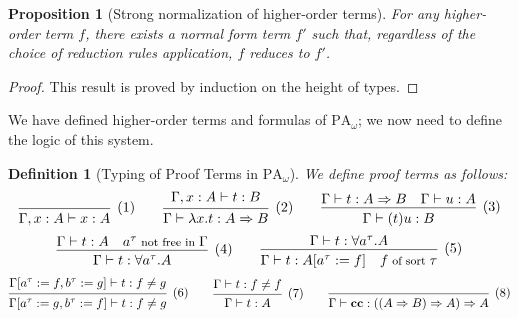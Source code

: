 \documentclass[a4paper,12pt]{article}
\newtheorem{prop}[theo]{Proposition}
\newtheorem{defi}[theo]{Definition}
\theoremstyle{rmqstyle}
\newcommand{\PA}{\mathrm{PA}}
\renewcommand{\implies}{\Rightarrow}
\newcommand{\cc}{\mathbf{cc}}
\begin{document}
\begin{prop}[Strong normalization of higher-order terms]
For any higher-order term $f$, there exists a normal form term $f'$ such that, regardless of the choice of reduction rules application, $f$ reduces to $f'$.
\end{prop}

\begin{proof}
This result is proved by induction on the height of types.
\end{proof}

We have defined higher-order terms and formulas of $\PA_\omega$; we now need to define the logic of this system.

\begin{defi}[Typing of Proof Terms in $\PA_\omega$]
We define proof terms as follows:
$$
\begin{prooftree}[center=false]
\infer0[(1)]{\Gamma, x : A \vdash x : A}
\end{prooftree}
\qquad
\begin{prooftree}[center=false]
\hypo{\Gamma, x : A \vdash t : B}
\infer1[(2)]{\Gamma \vdash \lambda x.t : A \implies B}
\end{prooftree}
\qquad
\begin{prooftree}[center=false]
\hypo{\Gamma \vdash t : A \implies B \quad \Gamma \vdash u : A}
\infer1[(3)]{\Gamma \vdash (t)u : B}
\end{prooftree}
$$
$$
\begin{prooftree}[center=false]
\hypo{\Gamma \vdash t : A \quad {\footnotesize a^\tau \text{ not free in } \Gamma}}
\infer1[(4)]{\Gamma \vdash t : \forall a^\tau. A}
\end{prooftree}
\qquad
\begin{prooftree}[center=false]
\hypo{\Gamma \vdash t : \forall a^\tau. A}
\infer1[(5)]{\Gamma \vdash t :A[a^\tau := f] \quad {\footnotesize f \text{ of sort } \tau}}
\end{prooftree}
$$
$$
\begin{prooftree}[center=false]
\hypo{\Gamma[a^\tau := f, b^\tau := g] \vdash t : f \neq g}
\infer1[(6)]{\Gamma[a^\tau := g, b^\tau := f] \vdash t : f \neq g}
\end{prooftree}
\qquad
\begin{prooftree}[center=false]
\hypo{\Gamma \vdash t : f \neq f}
\infer1[(7)]{\Gamma \vdash t : A}
\end{prooftree}
\qquad
\begin{prooftree}[center=false]
\infer0[(8)]{\Gamma \vdash \cc : ((A \implies B) \implies A) \implies A}
\end{prooftree}
$$
\end{defi}
\end{document}
